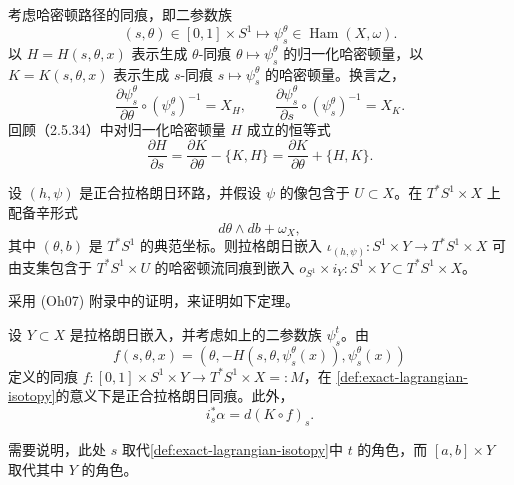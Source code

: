考虑哈密顿路径的同痕，即二参数\termHamiltonianDiffeomorphism{}族
\[
 (s,\theta)\in[0,1]\times S^1\longmapsto
 \psi_s^\theta\in\operatorname{Ham}(X,\omega).
\]
以 $H=H(s,\theta,x)$ 表示生成 $\theta$-同痕
$\theta\mapsto\psi_s^\theta$ 的归一化哈密顿量，以
$K=K(s,\theta,x)$ 表示生成 $s$-同痕 $s\mapsto\psi_s^\theta$ 的哈密顿量。换言之，
\[
 \frac{\partial\psi_s^\theta}{\partial\theta}\circ(\psi_s^\theta)^{-1}=X_H,
 \qquad
 \frac{\partial\psi_s^\theta}{\partial s}\circ(\psi_s^\theta)^{-1}=X_K.
\]
回顾（2.5.34）中对归一化哈密顿量 $H$ 成立的恒等式
\begin{equation}
 \frac{\partial H}{\partial s}
 =\frac{\partial K}{\partial\theta}-\{K,H\}
 =\frac{\partial K}{\partial\theta}+\{H,K\}.
 \label{eq:two-parameter-hamiltonian-identity}
\end{equation}

\begin{proposition}\label{prop:suspension-hamiltonian-isotopic-product}
设 $(h,\psi)$ 是正合拉格朗日环路，并假设 $\psi$ 的像包含于
$U\subset X$。在 $T^*S^1\times X$ 上配备辛形式
\[
 d\theta\wedge db+\omega_X,
\]
其中 $(\theta,b)$ 是 $T^*S^1$ 的典范坐标。则拉格朗日嵌入
$\iota_{(h,\psi)}:S^1\times Y\to T^*S^1\times X$ 可由支集包含于
$T^*S^1\times U$ 的哈密顿流同痕到嵌入
$o_{S^1}\times i_Y:S^1\times Y\subset T^*S^1\times X$。
\end{proposition}

采用 (Oh07) 附录中的证明，来证明如下定理。

\begin{theorem}\label{thm:two-parameter-suspension-exact}
设 $Y\subset X$ 是拉格朗日嵌入，并考虑如上的二参数\termHamiltonianDiffeomorphism{}族
$\psi_s^t$。由
\begin{equation}
 f(s,\theta,x)
 =(\theta,-H(s,\theta,\psi_s^\theta(x)),\psi_s^\theta(x))
 \label{eq:two-parameter-suspension-map}
\end{equation}
定义的同痕
$f:[0,1]\times S^1\times Y\to T^*S^1\times X=:M$，在
\cref{def:exact-lagrangian-isotopy}的意义下是正合拉格朗日同痕。此外，
\begin{equation}
 i_s^*\alpha=d(K\circ f)_s.
 \label{eq:suspension-exact-primitive}
\end{equation}
\end{theorem}

需要说明，此处 $s$ 取代\cref{def:exact-lagrangian-isotopy}中 $t$ 的角色，而
$[a,b]\times Y$ 取代其中 $Y$ 的角色。

